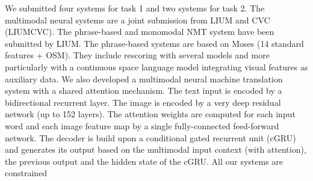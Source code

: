 We submitted four systems for task 1 and two systems for task 2. The multimodal neural systems are a joint submission from LIUM and CVC (LIUMCVC). The phrase-based and monomodal NMT system have been submitted by LIUM. The phrase-based systems are based on Moses (14 standard features + OSM). They include rescoring with several models and more particularly with a continuous space language model integrating visual features as auxiliary data. We also developed a multimodal neural machine translation system with a shared attention mechanism. The text input is encoded by a bidirectional recurrent layer. The image is encoded by a very deep residual network (up to 152 layers). The attention weights are computed for each input word and each image feature map by a single fully-connected feed-forward network. The decoder is build upon a conditional gated recurrent unit (cGRU) and generates its output based on the multimodal input context (with attention), the previous output and the hidden state of the cGRU. All our systems are constrained

